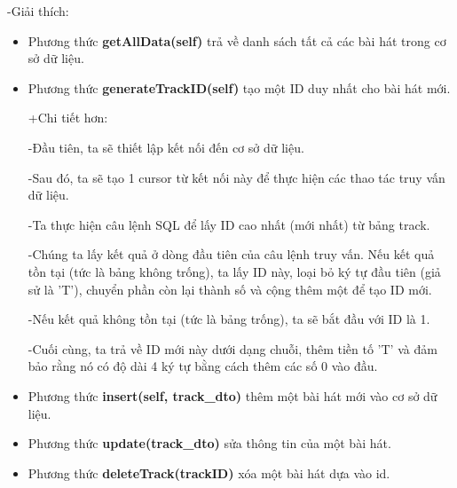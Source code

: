 \documentclass[a4paper]{article}
\begin{document}
\begin{flushleft}
	-Giải thích:
	\begin{itemize}
		\item Phương thức \textbf{getAllData(self)} trả về danh sách tất cả các bài hát trong cơ sở dữ liệu.

		\item Phương thức \textbf{generateTrackID(self)} tạo một ID duy nhất cho bài hát mới.
		      \begin{flushleft}
			      +Chi tiết hơn:

			      -Đầu tiên, ta sẽ thiết lập kết nối đến cơ sở dữ liệu.

			      -Sau đó, ta sẽ tạo 1 cursor từ kết nối này để thực hiện các thao tác truy vấn dữ liệu.

			      -Ta thực hiện câu lệnh SQL để lấy ID cao nhất (mới nhất) từ bảng track.

			      -Chúng ta lấy kết quả ở dòng đầu tiên của câu lệnh truy vấn. Nếu kết quả tồn tại (tức là bảng không trống), ta lấy ID này, loại bỏ ký tự đầu tiên (giả sử là 'T'), chuyển phần còn lại thành số và cộng thêm một để tạo ID mới.

			      -Nếu kết quả không tồn tại (tức là bảng trống), ta sẽ bắt đầu với ID là 1.

			      -Cuối cùng, ta trả về ID mới này dưới dạng chuỗi, thêm tiền tố 'T' và đảm bảo rằng nó có độ dài 4 ký tự bằng cách thêm các số 0 vào đầu.
		      \end{flushleft}

		\item Phương thức \textbf{insert(self, track\_dto)} thêm một bài hát mới vào cơ sở dữ liệu.

		\item Phương thức \textbf{update(track\_dto)} sửa thông tin của một bài hát.

		\item Phương thức \textbf{deleteTrack(trackID)} xóa một bài hát dựa vào id.

	\end{itemize}
\end{flushleft}
\clearpage
\end{document}
